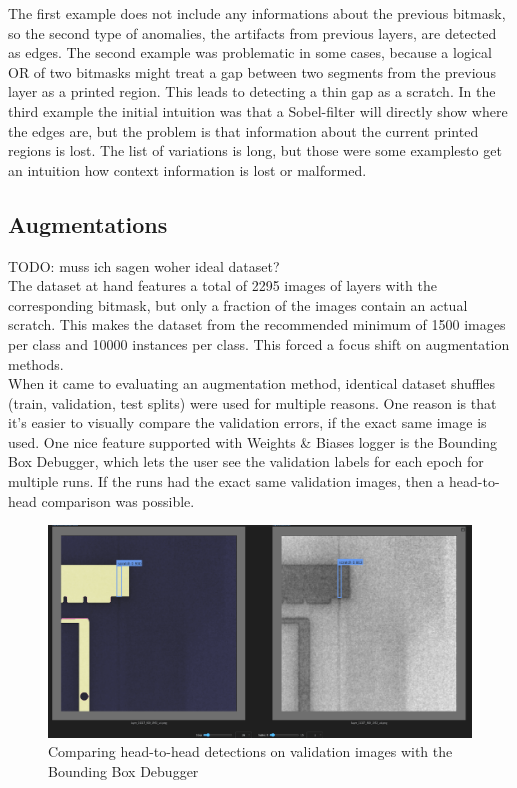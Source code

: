 The first example does not include any informations about the previous bitmask, so the second type of anomalies, the artifacts from previous layers, are detected as edges. The second example was problematic in some cases, because a logical OR of two bitmasks might treat a gap between two segments from the previous layer as a printed region. This leads to detecting a thin gap as a scratch. In the third example the initial intuition was that a Sobel-filter will directly show where the edges are, but the problem is that information about the current printed regions is lost. The list of variations is long, but those were some examplesto get an intuition how context information is lost or malformed.





\subsection{Augmentations}
TODO: muss ich sagen woher ideal dataset? \\
The dataset at hand features a total of 2295 images of layers with the corresponding bitmask, but only a fraction of the images contain an actual scratch. This makes the dataset from the recommended minimum of 1500 images per class and 10000 instances per class. This forced a focus shift on augmentation methods. \\
When it came to evaluating an augmentation method, identical dataset shuffles (train, validation, test splits) were used for multiple reasons. One reason is that it's easier to visually compare the validation errors, if the exact same image is used. One nice feature supported with Weights \& Biases logger is the Bounding Box Debugger, which lets the user see the validation labels for each epoch for multiple runs. If the runs had the exact same validation images, then a head-to-head comparison was possible.\\

\begin{figure}
    \centering
    \includegraphics[width=\textwidth]{images/bb_debugger}
    \caption{Comparing head-to-head detections on validation images with the Bounding Box Debugger}
    \label{fig:bb_deb}
\end{figure}

